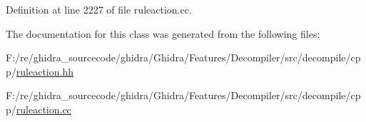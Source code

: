 Definition at line 2227 of file ruleaction.\+cc.



The documentation for this class was generated from the following files\+:\begin{DoxyCompactItemize}
\item 
F\+:/re/ghidra\+\_\+sourcecode/ghidra/\+Ghidra/\+Features/\+Decompiler/src/decompile/cpp/\mbox{\hyperlink{ruleaction_8hh}{ruleaction.\+hh}}\item 
F\+:/re/ghidra\+\_\+sourcecode/ghidra/\+Ghidra/\+Features/\+Decompiler/src/decompile/cpp/\mbox{\hyperlink{ruleaction_8cc}{ruleaction.\+cc}}\end{DoxyCompactItemize}
